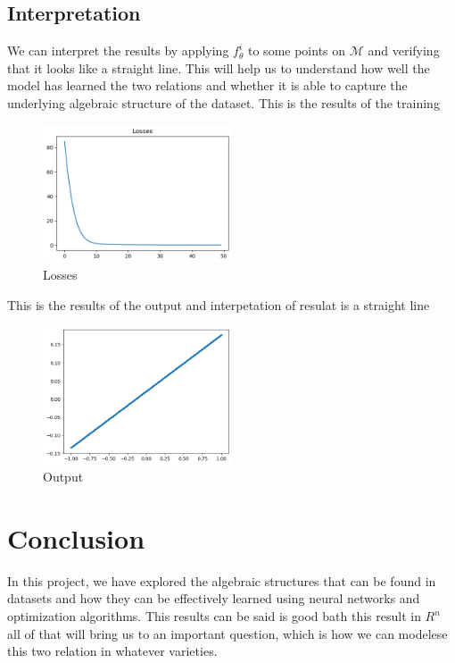 \documentclass{report}
\begin{document}
    \subsection{Interpretation}
    We can interpret the results by applying $f_\theta^i$ to some points on $\mathcal{M}$
    and verifying that it looks like a straight line. This will help us to understand 
    how well the model has learned the two relations and whether it is able to capture
    the underlying algebraic structure of the dataset.
    This is the results of the training 
    \begin{figure}[h!]
        \centering
        \includegraphics[width=0.5\textwidth]{optim.png}
        \caption{Losses}
        \label{fig:losses}
        \end{figure}
    This is the results of the output and interpetation of resulat is a straight line
        \begin{figure}[h!]
            \centering
            \includegraphics[width=0.5\textwidth]{output.png}
            \caption{Output}
            \label{fig:straight}
            \end{figure}


    \section{Conclusion}
    In this project, we have explored the algebraic 
    structures that can be found in datasets and
    how they can be effectively learned using
    neural networks and optimization algorithms.
    This results can be said is good bath this result in 
    $R^n$ all of that will bring us to an important question,
    which is how we can modelese this two relation in whatever varieties.


    
\end{document}
